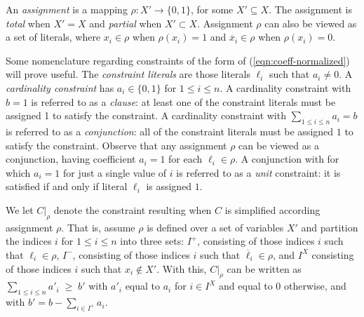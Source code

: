 \documentclass{easychair}
\renewcommand{\obar}[1]{\overline{#1}}
\newcommand{\lit}{\ell}
\newcommand{\assign}{\rho}
\newcommand{\simplify}[2]{#1|_{#2}}
\newcommand{\nassign}{\obar{\assign}}
\newcommand{\func}[1]{\llbracket#1\rrbracket}
\begin{document}
An {\em assignment} is a mapping $\assign : X' \rightarrow \{0,1\}$,
for some $X' \subseteq X$.  The assignment is {\em total} when $X' =
X$ and {\em partial} when $X' \subset X$.  Assignment $\assign$ can
also be viewed as a set of literals, where $x_i \in \assign$ when
$\assign(x_i) = 1$ and $\obar{x}_i \in \assign$ when $\assign(x_i) = 0$.

Some nomenclature regarding constraints of the form of
(\ref{eqn:coeff-normalized}) will prove useful.  The {\em constraint
  literals} are those literals $\lit_i$ such that $a_i \not = 0$.  A
{\em cardinality constraint} has $a_i \in \{0,1\}$ for $1 \leq i \leq
n$.  A cardinality constraint with $b=1$ is referred to as a {\em
  clause}: at least one of the constraint literals must be assigned 1
to satisfy the constraint.  A cardinality constraint with $\sum_{1\leq
  i\leq n} a_i = b$ is referred to as a {\em conjunction}: all of the
constraint literals must be assigned $1$ to satisfy the constraint.
Observe that any assignment $\assign$ can be viewed as a conjunction,
having coefficient $a_i = 1$ for each $\lit_i \in \assign$.  A
conjunction with for which $a_i = 1$ for just a single value of $i$ is
referred to as a {\em unit} constraint: it is satisfied if and only if
literal $\lit_i$ is assigned $1$.




We let $\simplify{C}{\assign}$ denote the constraint resulting when $C$ is
simplified according assignment $\assign$.  That is, assume $\assign$ is defined over a set of variables $X'$ and
partition the indices $i$ for $1 \leq i \leq n$ into
three sets:
$I^{+}$, consisting of those indices $i$ such that $\lit_{i} \in \assign$,
$I^{-}$, consisting of those indices $i$ such that $\obar{\lit}_{i} \in \assign$,
and $I^{X}$ consisting of those indices $i$ such that $x_i \not \in X'$.
With this, $\simplify{C}{\assign}$ can be written as $\sum_{1 \leq i \leq n} a'_i \; \geq \; b'$
with $a'_i$ equal to $a_i$ for $i \in I^{X}$ and equal to $0$ otherwise, and with $b' = b - \sum_{i\in I^{+}} a_i$.
\end{document}
